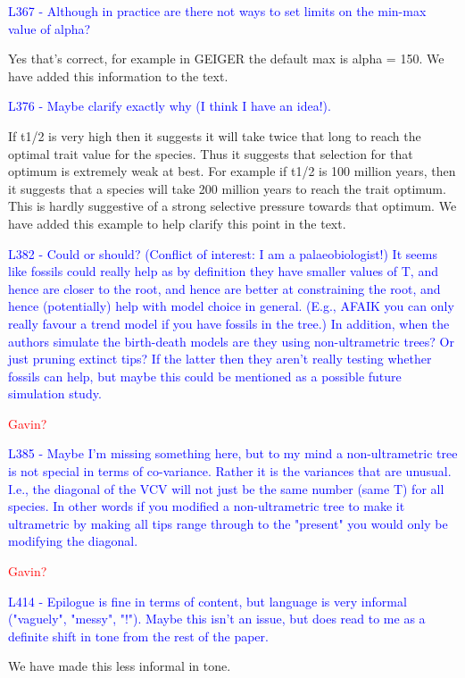 \documentclass[12pt]{letter}
\begin{document}
\begin{letter}{}
\textcolor{blue}{L367 - Although in practice are there not ways to set limits on the min-max value of alpha?}

Yes that's correct, for example in GEIGER the default max is alpha = 150. We have added this information to the text. 

\textcolor{blue}{L376 - Maybe clarify exactly why (I think I have an idea!).}

If t1/2 is very high then it suggests it will take twice that long to reach the optimal trait value for the species. Thus it suggests that selection for that optimum is extremely weak at best. For example if t1/2 is 100 million years, then it suggests that a species will take 200 million years to reach the trait optimum. This is hardly suggestive of a strong selective pressure towards that optimum. We have added this example to help clarify this point in the text.

\textcolor{blue}{L382 - Could or should? (Conflict of interest: I am a palaeobiologist!) It seems like fossils could really help as by definition they have smaller values of T, and hence are closer to the root, and hence are better at constraining the root, and hence (potentially) help with model choice in general. (E.g., AFAIK you can only really favour a trend model if you have fossils in the tree.) In addition, when the authors simulate the birth-death models are they using non-ultrametric trees? Or just pruning extinct tips? If the latter then they aren't really testing whether fossils can help, but maybe this could be mentioned as a possible future simulation study.}

\textcolor{red}{Gavin?}

\textcolor{blue}{L385 - Maybe I'm missing something here, but to my mind a non-ultrametric tree is not special in terms of co-variance. Rather it is the variances that are unusual. I.e., the diagonal of the VCV will not just be the same number (same T) for all species. In other words if you modified a non-ultrametric tree to make it ultrametric by making all tips range through to the "present" you would only be modifying the diagonal.}

\textcolor{red}{Gavin?}

\textcolor{blue}{L414 - Epilogue is fine in terms of content, but language is very informal ("vaguely", "messy", "!"). Maybe this isn't an issue, but does read to me as a definite shift in tone from the rest of the paper.}

We have made this less informal in tone.


\end{letter}
\end{document}
